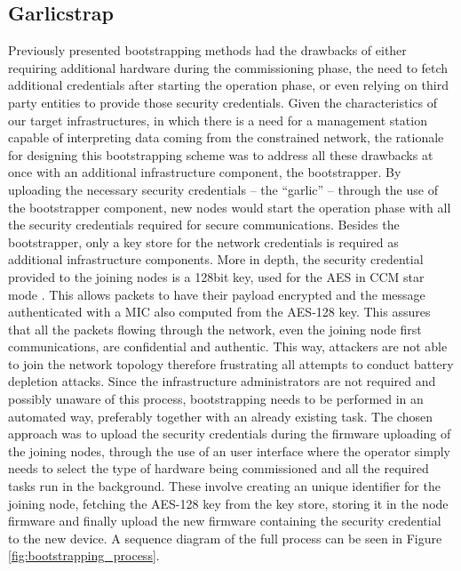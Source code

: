 \documentclass{llncs}
\begin{document}
\subsection{Garlicstrap}
\label{sec:implementation_details}
Previously presented bootstrapping methods had the drawbacks of either requiring additional hardware during the commissioning phase, the need to fetch additional credentials after starting the operation phase, or even relying on third party entities to provide those security credentials. Given the characteristics of our target infrastructures, in which there is a need for a management station capable of interpreting data coming from the constrained network, the rationale for designing this bootstrapping scheme was to address all these drawbacks at once with an additional infrastructure component, the bootstrapper. By uploading the necessary security credentials -- the ``garlic'' -- through the use of the bootstrapper component, new nodes would start the operation phase with all the security credentials required for secure communications. Besides the bootstrapper, only a key store for the network credentials is required as additional infrastructure components. More in depth, the security credential provided to the joining nodes is a 128bit key, used for the \ac{AES} \cite{Fips2001} in \ac{CCM} star mode \cite{Corp2005}. This allows packets to have their payload encrypted and the message authenticated with a \ac{MIC} also computed from the AES-128 key. This assures that all the packets flowing through the network, even the joining node first communications, are confidential and authentic. This way, attackers are not able to join the network topology therefore frustrating all attempts to conduct battery depletion attacks. Since the infrastructure administrators are not required and possibly unaware of this process, bootstrapping needs to be performed in an automated way, preferably together with an already existing task. The chosen approach was to upload the security credentials during the firmware uploading of the joining nodes, through the use of an user interface where the operator simply needs to select the type of hardware being commissioned and all the required tasks run in the background. These involve creating an unique identifier for the joining node, fetching the AES-128 key from the key store, storing it in the node firmware and finally upload the new firmware containing the security credential to the new device. A sequence diagram of the full process can be seen in Figure \ref{fig:bootstrapping_process}.
\end{document}
